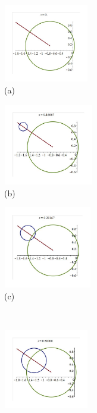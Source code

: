 \documentclass[12pt,a4paper]{article}%
\begin{document}
\begin{figure}
\begin{center}
\parbox[b]{1.5in}{\begin{center}
\includegraphics[natheight=2.735500in,natwidth=2.991800in,height=1.3482in,width=1.4733in]{PJH75H12.pdf}
\\
(a)
\end{center}}
\qquad
\parbox[b]{1.5in}{\begin{center}
\includegraphics[natheight=2.735500in,natwidth=3.041500in,height=1.3997in,width=1.5549in]{PJH75H13.pdf}
\\
(b)
\end{center}}
\qquad
\parbox[b]{1.5in}{\begin{center}
\includegraphics[natheight=2.727500in,natwidth=2.962500in,height=1.405in,width=1.5247in]{PJH75H14.pdf}
\\
(c)
\end{center}}
\\
\parbox[b]{1.5in}{\begin{center}
\includegraphics[natheight=2.756700in,natwidth=2.948300in,height=1.3686in,width=1.4635in]{PJH75H15.pdf}

\end{center}}
\end{center}
\end{figure}
\end{document}
